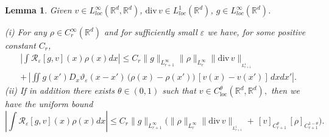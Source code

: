 \documentclass[a4paper,11pt]{article}
\newtheorem{lemma}[theorem]{Lemma}
\newcommand{\loc}{\mathrm{loc}}
\newcommand{\eps}{\varepsilon}
\begin{document}
\begin{lemma} \label{chissa}
Given $ v    \in L_{loc}^{\infty}\left(
\mathbb{R}^{d},\mathbb{R}^{d}\right) $, ${\mathrm{div}\,}v\in
L_{loc}^{1}\left(  \mathbb{R}^{d}\right)$, $g    \in
L_{loc}^{\infty}\left(  \mathbb{R}^{d}\right)$.

\smallskip (i) For any $\rho \in C_r^{\infty} (  \mathbb{R}^{d})$
and for sufficiently small $\varepsilon$ we have,  for some positive
constant $C_r$,
 \begin{align}\label{dop}
\left|\int  \mathcal{R}_{\varepsilon}\left[  g,v\right] (  x)
\rho(x) dx \right| \le
 C_r \| g\|_{L^{\infty}_{r+1}} \|
\rho\|_{L^{\infty}_{r}}
 \| {\mathrm{div}\,} v
\|_{_{L_{r+1}^{1}}} \\ \nonumber
 + \,  \left|
  \iint g(x') D_x \vartheta_{\eps} ({x-x'}) \,
\big( \rho(x) - \rho(x') \big)\, [v(x)-v(x')] \, dx dx' \right|.
\end{align}
(ii) If  in addition  there exists $\theta \in (0,1)$ such that $
 v \in C_{\loc}^{\theta}(
\mathbb{R}^{d}, \mathbb{R}^{d}),
$ then we have the  uniform bound
$$
\left|\int \mathcal{R}_{\varepsilon}\left[  g,v\right] (  x) \rho(x)
dx \right| \le
 C_r \| g\|_{L^{\infty}_{r+1}} \big( \|
\rho\|_{L^{\infty}_{r}}
 \| {\mathrm{div}\,} v
\|_{_{L_{r+1}^{1}}} +  \, [ v ]_{C^{ \theta}_{r+1}}  \, [ \rho
]_{C^{1 - \theta}_{r+1}} \big).
$$
\end{lemma}
\end{document}
